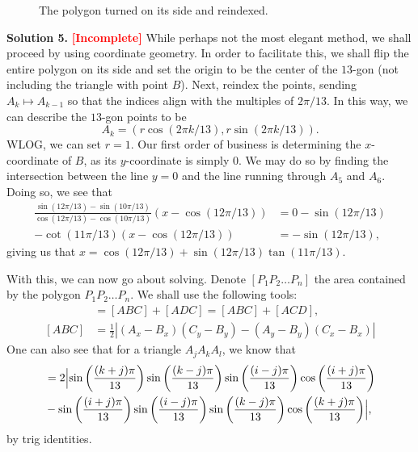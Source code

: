 \begin{solution}{5}
\begin{figure}
        \caption{The polygon turned on its side and reindexed.}
    \end{figure}
    \textbf{Solution 5.} \textbf{\textcolor{red}{[Incomplete]}} While perhaps not the most elegant method, we shall
    proceed by using coordinate geometry. In order to facilitate this, we shall flip the entire polygon on its side and set the origin to be the center of the \( 13 \)-gon (not including the triangle with point \( B \)). Next, reindex the points, sending \( A_k \mapsto A_{k - 1} \) so that the indices align with the multiples of \( 2\pi / 13 \). In this way, we can describe the \( 13 \)-gon points to be
    \[
        A_k = \left( r \cos{\left( 2 \pi k / 13 \right)}, r \sin{\left( 2 \pi k / 13 \right)} \right)
    .\]
    WLOG, we can set \( r = 1 \). Our first order of business is determining
    the \( x \)-coordinate of \( B \), as its \( y \)-coordinate is simply \( 0
    \). We may do so by finding the intersection between the line \( y = 0 \)
    and the line running through \( A_5 \) and \( A_6 \). Doing so, we see that
    \begin{align*}
        \frac{\sin{\left( 12 \pi / 13 \right)} - \sin{\left( 10 \pi / 13 \right)}}{\cos{\left( 12 \pi / 13 \right)} - \cos{\left( 10 \pi / 13 \right)}} \left( x - \cos{\left( 12 \pi / 13 \right)} \right) &= 0 - \sin{\left( 12 \pi / 13 \right)} \\
        - \cot{\left( 11 \pi / 13 \right)} \left( x - \cos{\left( 12 \pi / 13 \right)} \right) &= - \sin{\left( 12 \pi / 13 \right)}
    ,\end{align*}
    giving us that \( x = \cos{\left( 12 \pi / 13 \right)} + \sin{\left( 12 \pi / 13 \right)} \tan{\left( 11 \pi / 13 \right)} \).

    With this, we can now go about solving. Denote \( [P_{1} P_{2} \ldots P_{n}] \) the area contained by the polygon \( P_1 P_2 \ldots P_n \). We shall use the following tools:
    \begin{align*}
        [ABCD] &= [ABC] + [ADC] = [ABC] + [ACD], \\
        [ABC] &= \frac{1}{2} \left| (A_x - B_x) (C_y - B_y) - (A_y - B_y) (C_x - B_x) \right|
    \end{align*}
    One can also see that for a triangle \( A_j A_k A_l \), we know that
    \begin{align*}
        [A_i A_j A_k] &= 2\Bigl| \sin{\left( \frac{(k + j) \pi}{13} \right)} \sin{\left( \frac{(k - j) \pi}{13} \right)} \sin{\left( \frac{(i - j) \pi}{13} \right)} \cos{\left( \frac{(i + j) \pi}{13} \right)} \\
        &- \sin{\left( \frac{(i + j) \pi}{13} \right)} \sin{\left( \frac{(i - j) \pi}{13} \right)} \sin{\left( \frac{(k - j) \pi}{13} \right)} \cos{\left( \frac{(k + j) \pi}{13} \right)} \Bigr|
    ,\end{align*}
    by trig identities.


\end{solution}
